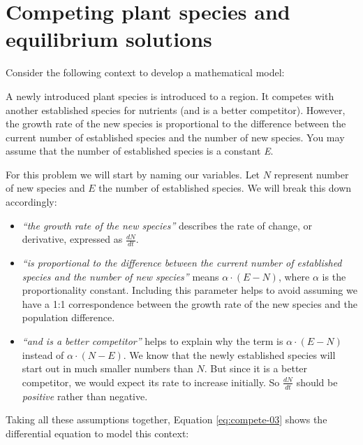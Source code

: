 \documentclass[
]{krantz}
\providecommand{\tightlist}{%
  \setlength{\itemsep}{0pt}\setlength{\parskip}{0pt}}
\renewenvironment{quote}{\begin{VF}}{\end{VF}}
\theoremstyle{definition}
\theoremstyle{definition}
\theoremstyle{definition}
\theoremstyle{definition}
\theoremstyle{remark}
\begin{document}
\hypertarget{competing-plant-species-and-equilibrium-solutions}{%
\section{Competing plant species and equilibrium solutions}\label{competing-plant-species-and-equilibrium-solutions}}

Consider the following context to develop a mathematical model:

\begin{quote}
A newly introduced plant species is introduced to a region. It competes with another established species for nutrients (and is a better competitor). However, the growth rate of the new species is proportional to the difference between the current number of established species and the number of new species. You may assume that the number of established species is a constant \emph{E}.
\end{quote}

For this problem we will start by naming our variables. Let \(N\) represent number of new species and \(E\) the number of established species. We will break this down accordingly:

\begin{itemize}
\tightlist
\item
  \emph{``the growth rate of the new species''} describes the rate of change, or derivative, expressed as \(\displaystyle \frac{dN}{dt}\).
\item
  \emph{``is proportional to the difference between the current number of established species and the number of new species''} means \(\displaystyle \alpha \cdot (E-N)\), where \(\alpha\) is the proportionality constant. Including this parameter helps to avoid assuming we have a 1:1 correspondence between the growth rate of the new species and the population difference.
\item
  \emph{``and is a better competitor''} helps to explain why the term is \(\displaystyle \alpha \cdot (E-N)\) instead of \(\displaystyle \alpha \cdot (N-E)\). We know that the newly established species will start out in much smaller numbers than \(N\). But since it is a better competitor, we would expect its rate to increase initially. So \(\displaystyle \frac{dN}{dt}\) should be \emph{positive} rather than negative.
\end{itemize}

Taking all these assumptions together, Equation \eqref{eq:compete-03} shows the differential equation to model this context:
\end{document}
